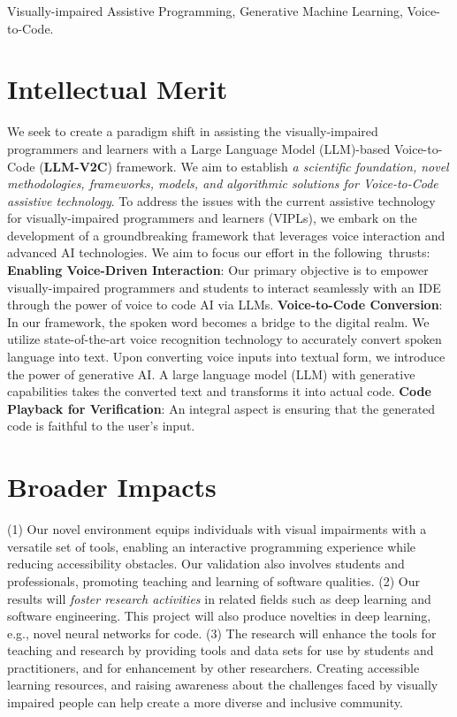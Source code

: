 \documentclass[11pt]{article}
\newcommand{\tool}{\textsc{LLM-V2C}\xspace}
\begin{document}
 Visually-impaired Assistive Programming, Generative
Machine Learning, Voice-to-Code.

\section{Intellectual Merit}

We seek to create a paradigm shift in assisting the visually-impaired
programmers and learners with a Large Language Model
(LLM)-based Voice-to-Code ({\bf LLM-V2C}) framework. We aim to establish {\em
  a scientific foundation, novel methodologies, frameworks, models,
  and algorithmic solutions for Voice-to-Code assistive technology}.
%
To address the issues with the current assistive technology for
visually-impaired programmers and learners (VIPLs), we embark on the
development of a groundbreaking framework that leverages voice
interaction and advanced AI technologies. We aim to focus our effort
in the following~thrusts: {\bf Enabling Voice-Driven Interaction}: Our
primary objective is to empower visually-impaired programmers and
students to interact seamlessly with an IDE through the power of voice
to code AI via LLMs. {\bf Voice-to-Code Conversion}: In our framework,
the spoken word becomes a bridge to the digital realm. We utilize
state-of-the-art voice recognition technology to accurately convert
spoken language into text. Upon converting voice inputs into textual
form, we introduce the power of generative AI. A large language model
(LLM) with generative capabilities takes the converted text and
transforms it into actual code. {\bf Code Playback for Verification}:
An integral aspect is ensuring that the generated code is faithful to
the user's input.
 
\section{Broader Impacts}


(1)
Our novel environment equips individuals with visual impairments with
a versatile set of tools, enabling an interactive programming
experience while reducing accessibility obstacles.
%
%
Our validation also involves students and professionals, promoting
teaching and learning of software qualities.
(2) Our results will {\em foster research activities} in related
fields such as deep learning and software engineering. This project
will also produce novelties in deep learning, e.g., novel neural
networks for code. (3) The research will enhance the tools for
teaching and research by providing tools and data sets for use by
students and practitioners, and for enhancement by other
researchers. Creating accessible learning resources, and raising
awareness about the challenges faced by visually impaired people
can help create a more diverse and inclusive community.
\end{document}
